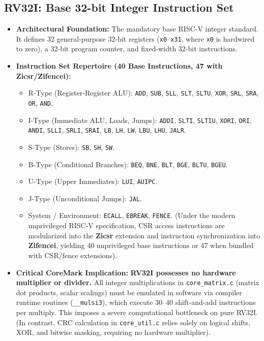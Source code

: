\documentclass[11pt,a4paper]{article}
\begin{document}
\subsection{RV32I: Base 32-bit Integer Instruction Set}
\begin{itemize}[leftmargin=1.4em]
    \item \textbf{Architectural Foundation:} The mandatory base RISC-V integer standard. It defines 32 general-purpose 32-bit registers (\texttt{x0}--\texttt{x31}, where \texttt{x0} is hardwired to zero), a 32-bit program counter, and fixed-width 32-bit instructions.
    \item \textbf{Instruction Set Repertoire (40 Base Instructions, 47 with Zicsr/Zifencei):}
    \begin{itemize}
        \item R-Type (Register-Register ALU): \texttt{ADD}, \texttt{SUB}, \texttt{SLL}, \texttt{SLT}, \texttt{SLTU}, \texttt{XOR}, \texttt{SRL}, \texttt{SRA}, \texttt{OR}, \texttt{AND}.
        \item I-Type (Immediate ALU, Loads, Jumps): \texttt{ADDI}, \texttt{SLTI}, \texttt{SLTIU}, \texttt{XORI}, \texttt{ORI}, \texttt{ANDI}, \texttt{SLLI}, \texttt{SRLI}, \texttt{SRAI}, \texttt{LB}, \texttt{LH}, \texttt{LW}, \texttt{LBU}, \texttt{LHU}, \texttt{JALR}.
        \item S-Type (Stores): \texttt{SB}, \texttt{SH}, \texttt{SW}.
        \item B-Type (Conditional Branches): \texttt{BEQ}, \texttt{BNE}, \texttt{BLT}, \texttt{BGE}, \texttt{BLTU}, \texttt{BGEU}.
        \item U-Type (Upper Immediates): \texttt{LUI}, \texttt{AUIPC}.
        \item J-Type (Unconditional Jumps): \texttt{JAL}.
        \item System / Environment: \texttt{ECALL}, \texttt{EBREAK}, \texttt{FENCE}. (Under the modern unprivileged RISC-V specification, CSR access instructions are modularized into the \textbf{Zicsr} extension and instruction synchronization into \textbf{Zifencei}, yielding 40 unprivileged base instructions or 47 when bundled with CSR/fence extensions).
    \end{itemize}
    \item \textbf{Critical CoreMark Implication:} \textbf{RV32I possesses no hardware multiplier or divider.} All integer multiplications in \texttt{core\_matrix.c} (matrix dot products, scalar scalings) must be emulated in software via compiler runtime routines (\texttt{\_\_mulsi3}), which execute 30--40 shift-and-add instructions per multiply. This imposes a severe computational bottleneck on pure RV32I. (In contrast, CRC calculation in \texttt{core\_util.c} relies solely on logical shifts, XOR, and bitwise masking, requiring no hardware multiplier).
\end{itemize}
\end{document}
